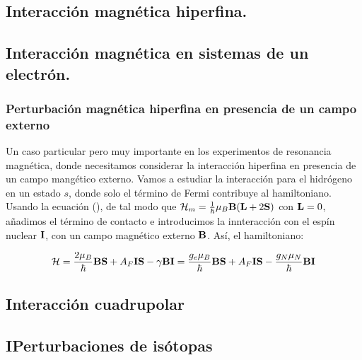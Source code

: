 \subsection{Interacción magnética hiperfina.}

\subsection{Interacción magnética en sistemas de un electrón.}

\subsubsection{Perturbación magnética hiperfina en presencia de un campo externo}

Un caso particular pero muy importante en los experimentos de resonancia magnética, donde necesitamos considerar la interacción hiperfina en presencia de un campo mangético externo. Vamos a estudiar la interacción para el hidrógeno en un estado $s$, donde solo el término de Fermi contribuye al hamiltoniano. Usando la ecuación (), de tal modo que $\mathcal{H}_m = \frac{1}{\hbar} \mu_B \mathbf{B} (\mathbf{L}+2\mathbf{S})$ con $\mathbf{L}=0$, añadimos el término de contacto e introducimos la innteracción con el espín nuclear $\mathbf{I}$, con un campo magnético externo $\mathbf{B}$. Así, el hamiltoniano:

\begin{equation}
    \mathcal{H} = \frac{2\mu_B}{\hbar} \mathbf{B} \mathbf{S} + A_F \mathbf{I} \mathbf{S} - \gamma \mathbf{B} \mathbf{I} = \frac{g_e \mu_B}{\hbar} \mathbf{B} \mathbf{S} + A_F \mathbf{I} \mathbf{S} - \frac{g_N \mu_N}{\hbar} \mathbf{B} \mathbf{I}
\end{equation}


\subsection{Interacción cuadrupolar}

\subsection{IPerturbaciones de isótopas}



